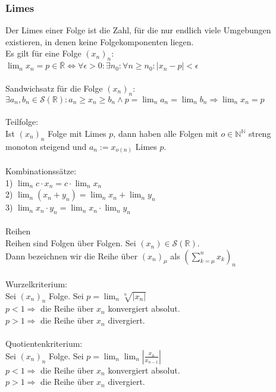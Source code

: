\documentclass[12pt, a4paper]{article}
\begin{document}
\subsubsection*{Limes}
Der Limes einer Folge ist die Zahl, für die nur endlich viele Umgebungen existieren, in denen keine Folgekomponenten liegen.\\
Es gilt für eine Folge \((x_n)_n\):\\
\(\lim_n x_n = p \in \overline{\mathbb{R}} \Longleftrightarrow \forall \epsilon > 0: \exists n_0: \forall n \ge n_0: |x_n - p| < \epsilon\) \\ \\
Sandwichsatz für die Folge \((x_n)_n\):\\
\(\exists a_n, b_n \in \mathcal{S}(\mathbb R): a_n \ge x_n \ge b_n \wedge p = \lim_{n} a_n = \lim_{n} b_n \Longrightarrow \lim_n x_n = p\) \\ \\
Teilfolge: \\
Ist \((x_n)_n\) Folge mit Limes \(p\), dann haben alle Folgen mit \(o \in \mathbb N ^ \mathbb N\) streng monoton steigend und \(a_n := x_{o(n)}\) Limes \(p\). \\ \\
Kombinationssätze:\\
1) \(\lim_n c \cdot x_n = c \cdot \lim_n x_n\) \\
2) \(\lim_n (x_n + y_n) = \lim_n x_n + \lim_n y_n\) \\
3) \(\lim_n x_n \cdot y_n = \lim_n x_n \cdot \lim_n y_n\) \\ \\
Reihen \\
Reihen sind Folgen über Folgen. Sei \((x_n) \in \mathcal{S}(\mathbb R)\).\\ Dann bezeichnen wir die Reihe über \((x_n)_\mu\) als \(\left(\sum_{k = \mu}^{n} x_k\right)_n\) \\ \\
Wurzelkriterium:\\
Sei \((x_n)_n\) Folge. Sei \(p = \lim_n \sqrt[n]{|x_n|}\) \\
\(p < 1 \Longrightarrow \) die Reihe über \(x_n\) konvergiert absolut. \\
\(p > 1 \Longrightarrow \) die Reihe über \(x_n\) divergiert. \\ \\
Quotientenkriterium:\\
Sei \((x_n)_n\) Folge. Sei \(p = \lim_n \lim_{n}|\frac{x_n}{x_{n-1}}|\) \\
\(p < 1 \Longrightarrow \) die Reihe über \(x_n\) konvergiert absolut. \\
\(p > 1 \Longrightarrow \) die Reihe über \(x_n\) divergiert. 
\end{document}
